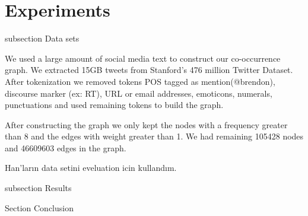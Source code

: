 \section{Experiments}
\label{sec:experiments}

subsection Data sets

We used a large amount of social media text to construct our co-occurrence graph. We extracted 15GB tweets from Stanford's 476 million Twitter Dataset\cite{DBLP:conf/wsdm/YangL11}. After tokenization we removed tokens POS tagged as mention(@brendon), discourse marker (ex: RT), URL or email addresses, emoticons, numerals, punctuations and used remaining tokens to build the graph.

After constructing the graph we only kept the nodes with a frequency greater than 8 and the edges with weight greater than 1. We had remaining 105428 nodes and 46609603 edges in the graph.

Han'ların data setini eveluation icin kullandım.

subsection Results


Section Conclusion
